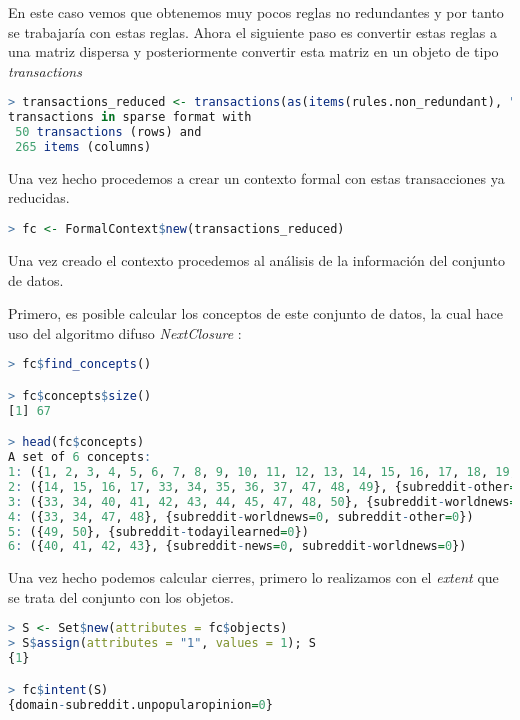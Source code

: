 \documentclass[../../main.tex]{subfiles}
\begin{document}
\vskip 0.2in

En este caso vemos que obtenemos muy pocos reglas no redundantes y por tanto se trabajaría con estas reglas. Ahora el siguiente paso es convertir estas reglas a una matriz dispersa y posteriormente convertir esta matriz en un objeto de tipo \textit{transactions}

\begin{lstlisting}[language=R]
> transactions_reduced <- transactions(as(items(rules.non_redundant), "ngCMatrix")); transactions_reduced
transactions in sparse format with
 50 transactions (rows) and
 265 items (columns)
\end{lstlisting}

\vskip 0.2in

Una vez hecho procedemos a crear un contexto formal con estas transacciones ya reducidas.

\begin{lstlisting}[language=R]
> fc <- FormalContext$new(transactions_reduced)
\end{lstlisting}

\vskip 0.2in

Una vez creado el contexto procedemos al análisis de la información del conjunto de datos.

Primero, es posible calcular los conceptos de este conjunto de datos, la cual hace uso del algoritmo difuso \textit{NextClosure} \cite{nextclosure}:

\begin{lstlisting}[language=R]
> fc$find_concepts()

> fc$concepts$size()
[1] 67

> head(fc$concepts)
A set of 6 concepts:
1: ({1, 2, 3, 4, 5, 6, 7, 8, 9, 10, 11, 12, 13, 14, 15, 16, 17, 18, 19, 20, 21, 22, 23, 24, 25, 26, 27, 28, 29, 30, 31, 32, 33, 34, 35, 36, 37, 38, 39, 40, 41, 42, 43, 44, 45, 46, 47, 48, 49, 50}, {})
2: ({14, 15, 16, 17, 33, 34, 35, 36, 37, 47, 48, 49}, {subreddit-other=0})
3: ({33, 34, 40, 41, 42, 43, 44, 45, 47, 48, 50}, {subreddit-worldnews=0})
4: ({33, 34, 47, 48}, {subreddit-worldnews=0, subreddit-other=0})
5: ({49, 50}, {subreddit-todayilearned=0})
6: ({40, 41, 42, 43}, {subreddit-news=0, subreddit-worldnews=0})
\end{lstlisting}

\vskip 0.2in
			
Una vez hecho podemos calcular cierres, primero lo realizamos con el \textit{\gls{extent}} que se trata del conjunto con los objetos.

\begin{lstlisting}[language=R]
> S <- Set$new(attributes = fc$objects)
> S$assign(attributes = "1", values = 1); S
{1}

> fc$intent(S)
{domain-subreddit.unpopularopinion=0}
\end{lstlisting}
\end{document}

